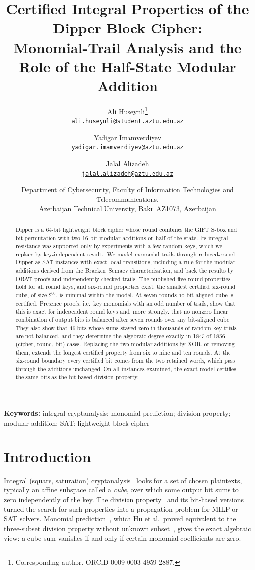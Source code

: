 \documentclass[11pt,a4paper]{article}
\title{Certified Integral Properties of the Dipper Block Cipher:\\
Monomial-Trail Analysis and the Role of the Half-State Modular Addition}
\author{Ali Huseynli\thanks{Corresponding author. ORCID 0009-0003-4959-2887.}\\
\small\href{mailto:ali.huseynli@student.aztu.edu.az}{\texttt{ali.huseynli@student.aztu.edu.az}}
\and Yadigar Imamverdiyev\\
\small\href{mailto:yadigar.imamverdiyev@aztu.edu.az}{\texttt{yadigar.imamverdiyev@aztu.edu.az}}
\and Jalal Alizadeh\\
\small\href{mailto:jalal.alizadeh@aztu.edu.az}{\texttt{jalal.alizadeh@aztu.edu.az}}}
\date{\small Department of Cybersecurity, Faculty of Information Technologies and Telecommunications,\\
Azerbaijan Technical University, Baku AZ1073, Azerbaijan}
\theoremstyle{definition}
\theoremstyle{remark}
\begin{document}
\maketitle

\begin{abstract}
Dipper is a 64-bit lightweight block cipher whose round combines the GIFT S-box and bit permutation with two 16-bit modular additions on half of the state. Its integral resistance was supported only by experiments with a few random keys, which we replace by key-independent results. We model monomial trails through reduced-round Dipper as SAT instances with exact local transitions, including a rule for the modular additions derived from the Braeken--Semaev characterisation, and back the results by DRAT proofs and independently checked trails. The published five-round properties hold for all round keys, and six-round properties exist; the smallest certified six-round cube, of size $2^{60}$, is minimal within the model. At seven rounds no bit-aligned cube is certified. Presence proofs, i.e.\ key monomials with an odd number of trails, show that this is exact for independent round keys and, more strongly, that no nonzero linear combination of output bits is balanced after seven rounds over any bit-aligned cube. They also show that 46 bits whose sums stayed zero in thousands of random-key trials are not balanced, and they determine the algebraic degree exactly in 1843 of 1856 (cipher, round, bit) cases. Replacing the two modular additions by XOR, or removing them, extends the longest certified property from six to nine and ten rounds. At the six-round boundary every certified bit comes from the two retained words, which pass through the additions unchanged. On all instances examined, the exact model certifies the same bits as the bit-based division property.
\end{abstract}

\noindent\textbf{Keywords:} integral cryptanalysis; monomial prediction; division property; modular addition; SAT; lightweight block cipher

\section{Introduction}

Integral (square, saturation) cryptanalysis~\cite{knudsen2002integral} looks for a set of chosen plaintexts, typically an affine subspace called a \emph{cube}, over which some output bit sums to zero independently of the key. The division property~\cite{todo2015} and its bit-based versions~\cite{todo2016bit,xiang2016milp} turned the search for such properties into a propagation problem for MILP or SAT solvers. Monomial prediction~\cite{hu2020mp}, which Hu et al.\ proved equivalent to the three-subset division property without unknown subset~\cite{hao2020}, gives the exact algebraic view: a cube sum vanishes if and only if certain monomial coefficients are zero.
\end{document}
